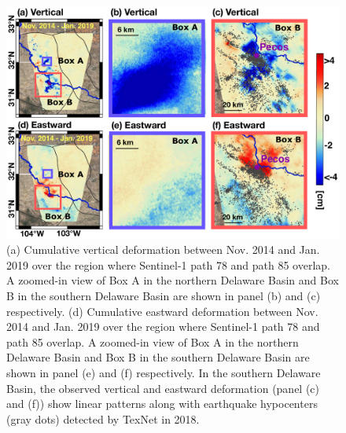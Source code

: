 \begin{figure}
	\centering
	\includegraphics[width=0.96\linewidth]{figures/chapter4-grl/figure4-east-vertical-6panel-labelled-small.pdf}
	\caption[Cumulative vertical and horizontal deformation]{(a) Cumulative vertical deformation between Nov. 2014 and Jan. 2019 over the region where Sentinel-1 path 78 and path 85 overlap. A zoomed-in view of Box A in the northern Delaware Basin and Box B in the southern Delaware Basin are shown in panel (b) and (c) respectively. (d) Cumulative eastward deformation between Nov. 2014 and Jan. 2019 over the region where Sentinel-1 path 78 and path 85 overlap. A zoomed-in view of Box A in the northern Delaware Basin and Box B in the southern Delaware Basin are shown in panel (e) and (f) respectively. In the southern Delaware Basin, the observed vertical and eastward deformation (panel (c) and (f)) show linear patterns along with earthquake hypocenters (gray dots) detected by TexNet in 2018.}
	\label{fig:insar-decomp}
\end{figure}


